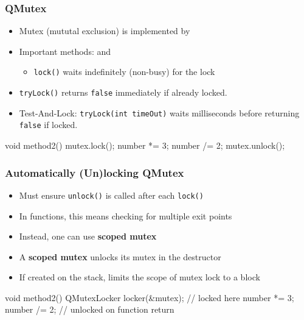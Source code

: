 \begin{slide}[fragile]
\frametitle{QMutex}
\begin{itemize}
\item Mutex (mututal exclusion) is implemented by 
\item Important methods:  and 
\begin{itemize}
\item \texttt{lock()} waits indefinitely (non-busy) for the lock
\end{itemize}
\item \texttt{tryLock()} returns \texttt{false} immediately if already locked.
\item Test-And-Lock: \texttt{tryLock(int timeOut)} waits milliseconds
before returning \texttt{false} if locked.
\end{itemize}

\begin{cpp}
void method2()
{
    mutex.lock();
    number *= 3;
    number /= 2;
    mutex.unlock();
}
\end{cpp}
\end{slide}
\begin{slide}[fragile]
\frametitle{Automatically (Un)locking QMutex}

\begin{itemize}
\item Must ensure \texttt{unlock()} is called after each \texttt{lock()}
\item In functions, this means checking for multiple exit points
\item Instead, one can use \textbf{scoped mutex} 
\item A \textbf{scoped mutex} unlocks its mutex in the destructor
\item If created on the stack, limits the scope of mutex lock to a block
\end{itemize}
\begin{cpp}
void method2()
{
    QMutexLocker locker(&mutex);  // locked here
    number *= 3;
    number /= 2;
}                                 // unlocked on function return
\end{cpp}
\end{slide}

